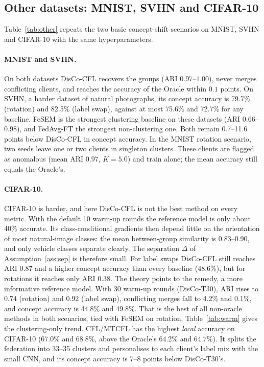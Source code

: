 \subsection{Other datasets: MNIST, SVHN and CIFAR-10}\label{sec:datasets}
Table~\ref{tab:other} repeats the two basic concept-shift scenarios on MNIST, SVHN and CIFAR-10 with the same hyperparameters.

\paragraph{MNIST and SVHN.} On both datasets DisCo-CFL recovers the groups (ARI $0.97$--$1.00$), never merges conflicting clients, and reaches the accuracy of the Oracle within $0.1$ points. On SVHN, a harder dataset of natural photographs, its concept accuracy is 79.7\% (rotation) and 82.5\% (label swap), against at most 75.6\% and 72.7\% for any baseline. FeSEM is the strongest clustering baseline on these datasets (ARI $0.66$--$0.98$), and FedAvg-FT the strongest non-clustering one. Both remain 0.7--11.6 points below DisCo-CFL in concept accuracy. In the MNIST rotation scenario, two seeds leave one or two clients in singleton clusters. These clients are flagged as anomalous (mean ARI $0.97$, $K=5.0$) and train alone; the mean accuracy still equals the Oracle's.

\paragraph{CIFAR-10.} CIFAR-10 is harder, and here DisCo-CFL is not the best method on every metric. With the default 10 warm-up rounds the reference model is only about 40\% accurate. Its class-conditional gradients then depend little on the orientation of most natural-image classes: the mean between-group similarity is 0.83--0.90, and only vehicle classes separate clearly. The separation $\Delta$ of Assumption~\ref{ass:sep} is therefore small. For label swaps DisCo-CFL still reaches ARI $0.87$ and a higher concept accuracy than every baseline (48.6\%), but for rotations it reaches only ARI $0.38$. The theory points to the remedy, a more informative reference model. With 30 warm-up rounds (DisCo-T30), ARI rises to $0.74$ (rotation) and $0.92$ (label swap), conflicting merges fall to 4.2\% and 0.1\%, and concept accuracy is 44.8\% and 49.8\%. That is the best of all non-oracle methods in both scenarios, tied with FeSEM on rotation. Table~\ref{tab:warm} gives the clustering-only trend. CFL/MTCFL has the highest \emph{local} accuracy on CIFAR-10 (67.0\% and 68.8\%, above the Oracle's 64.2\% and 64.7\%). It splits the federation into 33--35 clusters and personalises to each client's label mix with the small CNN, and its concept accuracy is 7--8 points below DisCo-T30's.


